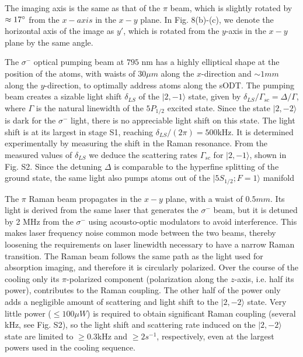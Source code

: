 \documentclass{article}
\begin{document}
The imaging axis is the same as that of the $\pi$ beam, which is slightly rotated by $\approx 17 \degree$ from the $x-axis$ in the $x-y$ plane. In Fig. 8(b)-(c), we denote the horizontal axis of the image as $y'$, which is rotated from the $y$-axis in the $x-y$ plane by the same angle.

The $\sigma^-$ optical pumping beam at $795$ nm has a highly elliptical shape at the position of the atoms, with waists of $30 \mu m$ along the $x$-direction and $\sim 1 mm$ along the $y$-direction, to optimally address atoms along the sODT. The pumping beam creates a sizable light shift $\delta_{LS}$ of the $\vert 2, -1 \rangle$ state, given by $\delta_{LS}/\Gamma_{sc} = \Delta / \Gamma$, where $\Gamma$ is the natural linewidth of the $5P_{1/2}$ excited state. Since the state $\vert 2, -2 \rangle$ is dark for the $\sigma^-$ light, there is no appreciable light shift on this state. The light shift is at its largest in stage S1, reaching $\delta_{LS} / (2\pi) = 500$kHz. It is determined experimentally by measuring the shift in the Raman resonance. From the measured values of $\delta_{LS}$ we deduce the scattering rates $\Gamma_{sc}$ for $\vert 2, -1 \rangle$, shown in Fig. S2. Since the detuning $\Delta$ is comparable to the hyperfine splitting of the ground state, the same light also pumps atoms out of the $\vert 5 S_{1/2}; F=1\rangle$ manifold

The $\pi$ Raman beam propagates in the $x-y$ plane, with a waist of $0.5 mm$. Its light is derived from the same laser that generates the $\sigma^-$ beam, but it is detuned by 2 MHz from the $\sigma^-$ using acousto-optic modulators to avoid interference. This makes laser frequency noise common mode between the two beams, thereby loosening the requirements on laser linewidth necessary to have a narrow Raman transition. The Raman beam follows the same path as the light used for absorption imaging, and therefore it is circularly polarized. Over the course of the cooling only its $\pi$-polarized component (polarization along the $z$-axis, i.e. half its power), contributes to the Raman coupling. The other half of the power only adds a negligible amount of scattering and light shift to the $\vert 2, -2 \rangle$ state. Very little power ($\leq 100 \mu W$) is required to obtain significant Raman coupling (several kHz, see Fig. S2), so the light shift and scattering rate induced on the $\vert 2, -2 \rangle$ state are limited to $\geq 0.3$kHz and $\geq 2 s^{-1}$, respectively, even at the largest powers used in the cooling sequence.
\end{document}
